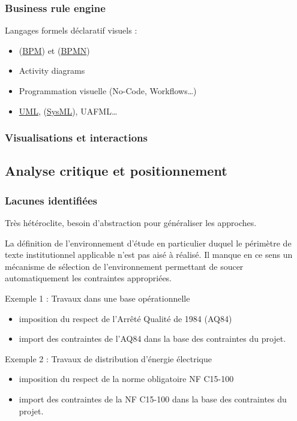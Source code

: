 \documentclass[a4paper,12pt]{article}
\begin{document}
\subsubsection{Business rule engine}
\label{sec:org327efb2}
Langages formels déclaratif visuels : 
\begin{itemize}
\item (\protect\hyperlink{gls-8}{\label{gls-8-use-1}BPM}) et  (\protect\hyperlink{gls-9}{\label{gls-9-use-1}BPMN})
\item Activity diagrams
\item Programmation visuelle (No-Code, Workflows\ldots{})
\item \protect\hyperlink{gls-3}{\label{gls-3-use-2}UML},  (\protect\hyperlink{gls-10}{\label{gls-10-use-1}SysML}), UAFML…
\end{itemize}
\subsubsection{Visualisations et interactions}
\label{sec:orgbe02b03}
\subsection{Analyse critique et positionnement}
\label{sec:org05ac992}
\subsubsection{Lacunes identifiées}
\label{sec:orga413407}
Très hétéroclite, besoin d’abstraction pour généraliser les approches.

La définition de l'environnement d'étude en particulier duquel le périmètre de texte institutionnel applicable n'est pas aisé à réalisé.
Il manque en ce sens un mécanisme de sélection de l'environnement permettant de soucer automatiquement les contraintes appropriées.

Exemple 1 : Travaux dans une base opérationnelle
\begin{itemize}
\item imposition du respect de l'Arrêté Qualité de 1984 (AQ84)
\item import des contraintes de l'AQ84 dans la base des contraintes du projet.
\end{itemize}


Exemple 2 : Travaux de distribution d'énergie électrique
\begin{itemize}
\item imposition du respect de la norme obligatoire NF C15-100
\item import des contraintes de la NF C15-100 dans la base des contraintes du projet.
\end{itemize}
\end{document}
